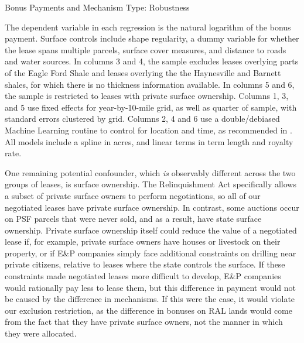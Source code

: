 \documentclass[12pt]{article}
\begin{document}
\begin{table}[!htbp]
	\begin{center}
	\begin{threeparttable}
		\caption{Bonus Payments and Mechanism Type: Robustness}
		\label{tab:BonusRobust}
		\small
		            
		\begin{tablenotes}
		\footnotesize
		\item The dependent variable in each regression is the natural logarithm of the bonus payment.  Surface controls include shape regularity, a dummy variable for whether the lease spans multiple parcels, surface cover measures, and distance to roads and water sources.  In columns 3 and 4, the sample excludes leases overlying parts of the Eagle Ford Shale and leases overlying the the Haynesville and Barnett shales, for which there is no thickness information available.  In columns 5 and 6, the sample is restricted to leases with private surface ownership.  Columns 1, 3, and 5  use fixed effects for year-by-10-mile grid, as well as quarter of sample, with standard errors clustered by grid.  Columns 2, 4 and 6 use a double/debiased Machine Learning routine to control for location and time, as recommended in \cite{chernozhukov2018double}.  All models include a spline in acres, and linear terms in term length and royalty rate.
		\end{tablenotes}
	\end{threeparttable}
	\end{center}
\end{table}
\addtolength{\tabcolsep}{-6pt}

One remaining potential confounder, which \emph{is} observably different across the two groups of leases, is surface ownership. The Relinquishment Act specifically allows a subset of private surface owners to perform negotiations, so all of our negotiated leases have private surface ownership. In contrast, some auctions occur on PSF parcels that were never sold, and as a result, have state surface ownership.  Private surface ownership itself could reduce the value of a negotiated lease if, for example, private surface owners have houses or livestock on their property, or if E\&P companies simply face additional constraints on drilling near private citizens, relative to leases where the state controls the surface. If these constraints made negotiated leases more difficult to develop, E\&P companies would rationally pay less to lease them, but this difference in payment would not be caused by the difference in mechanisms. If this were the case, it would violate our exclusion restriction, as the difference in bonuses on RAL lands would come from the fact that they have private surface owners, not the manner in which they were allocated.
\end{document}
